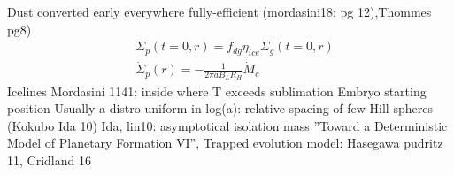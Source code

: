 \begin{workout}
	Dust converted early everywhere fully-efficient (mordasini18: pg 12),Thommes pg8)
	\begin{align*}
		&\Sigma_p(t=0,r)=f_{dg}\eta_{ice}\Sigma_g(t=0,r)\\
		&\dot{\Sigma}_p(r)=-\frac{1}{2\pi aB_LR_H}\dot{M}_c
	\end{align*}
	Icelines Mordasini 1141: inside where T exceeds sublimation
	{Embryo starting position}
	Usually a distro uniform in log(a): relative spacing of few Hill spheres (Kokubo Ida 10)
	Ida, lin10: asymptotical isolation mass ''Toward a Deterministic Model of Planetary Formation VI'',
	Trapped evolution model: Hasegawa pudritz 11, Cridland 16
\end{workout}



